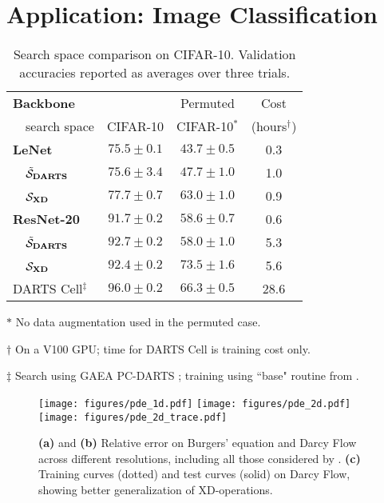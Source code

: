 \section{Application: Image Classification}


\begin{table}[!t]
	\centering
	\begin{threeparttable}
		\begin{tabular}{lccc}
			\hline
			{\bf Backbone} & & Permuted & Cost \\
			~~search space & CIFAR-10 & CIFAR-10$^\ast$ & (hours$^\dagger$) \\
			\hline
			{\bf LeNet} & $75.5\pm0.1$ & $43.7\pm0.5$ & 0.3 \\
			~~$\tilde{\mathcal S}_{\mathbf{DARTS}}$ & $75.6\pm3.4$ & $47.7\pm1.0$ & 1.0 \\
			~~$\mathcal S_{\mathbf{XD}}$ & $77.7\pm0.7$ & $63.0\pm1.0$ & 0.9 \\
			\hline
			{\bf ResNet-20} & $91.7\pm0.2$ & $58.6\pm0.7$ & 0.6 \\
			~~$\tilde{\mathcal S}_{\mathbf{DARTS}}$ & $92.7\pm0.2$ & $58.0\pm1.0$ & 5.3 \\
			~~$\mathcal S_{\mathbf{XD}}$ & $92.4\pm0.2$ & $73.5\pm1.6$ & 5.6 \\
			\hline
			DARTS Cell$^\ddagger$ & $96.0\pm0.2$ & $66.3\pm0.5$ & 28.6 \\
			\hline
		\end{tabular}
		\begin{tablenotes}\footnotesize
			\item[$\ast$] No data augmentation used in the permuted case.
			\item[$\dagger$] On a V100 GPU; time for DARTS Cell is training cost only.
			\item[$\ddagger$] Search using GAEA PC-DARTS \citep{li2021gaea}; training using ``base" routine from \citet{yang2020nas}.\vspace{-4pt}
		\end{tablenotes}
		\caption{\label{tab:cifar}
			Search space comparison on CIFAR-10.
			Validation accuracies reported as averages over three trials.\vspace{-4pt}
		}
	\end{threeparttable}
\end{table}

\begin{figure*}[!t]
	\centerline{\texttt{[image: figures/pde\_1d.pdf]}
		\texttt{[image: figures/pde\_2d.pdf]}
		\texttt{[image: figures/pde\_2d\_trace.pdf]}\vspace{-12pt}
	}
	\caption{
		\textbf{(a)} and \textbf{(b)} Relative error on Burgers' equation and Darcy Flow across different resolutions, including all those considered by \citet{li2021fno}.
		\textbf{(c)} Training curves (dotted) and test curves (solid) on Darcy Flow, showing better generalization of XD-operations.}
	\label{fig:pde}
\end{figure*}

